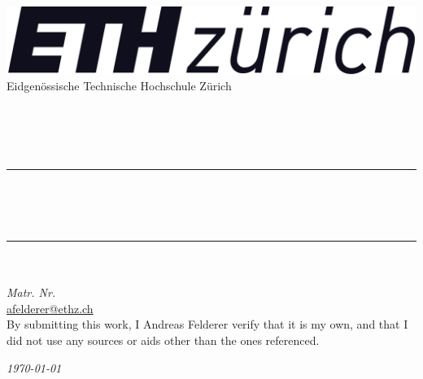\begin{titlepage}
	\centering
    \includegraphics[scale = 0.15]{figures/ETHZ_logo_black.png}\\[0.5 cm]	%
    {\Large Eidgenössische Technische Hochschule Zürich}\\[1.5 cm]
	
	{\large\ethfont \docLectureNumber}\\[0.8em]	%
	{\Large \bfseries\ethbfont \docLectureTitle}\\[1em]	%
	{\large \docTeacher}\\[0.3em]
	{\itshape \docTerm }\\[1cm]
	\rule{\linewidth}{0.2 mm} \\[0.5 cm]

	{\huge\bfseries\ethbfont \docTitle}\\[1em]
	{\Large\ethitfont \docSubTitle}\\
	\rule{\linewidth}{0.2 mm} \\[1.5 cm]
	
	{\Large\itshape \docAuthor }\\[0.3em]
	{\itshape Matr. Nr. \docMatNr }\\
	\href{mailto:afelderer@ethz.ch}{afelderer@ethz.ch} \\[1 cm]

    By submitting this work, I Andreas Felderer verify that it is my own, and that I did not use any sources or aids other than the ones referenced.

	\vfill


	{\itshape\large \today}
\end{titlepage}